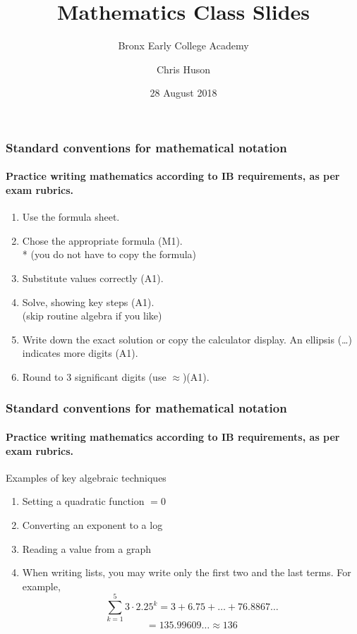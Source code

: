 \documentclass{beamer}
\title{Mathematics Class Slides}
\subtitle{Bronx Early College Academy}
\author{Chris Huson}
\date{28 August 2018}
\begin{document}
\frame{\titlepage}


 \frame
 {
   \frametitle{Standard conventions for mathematical notation}
   \framesubtitle{Practice writing mathematics according to IB requirements, as per exam rubrics.}
 \begin{enumerate}
     \item Use the formula sheet.
     \item Chose the appropriate formula (M1).\\*
     (you do not have to copy the formula)
     \item Substitute values correctly (A1).
     \item Solve, showing key steps (A1).\\
     (skip routine algebra if you like)
     \item Write down the exact solution or copy the calculator display. An ellipsis (\ldots) indicates more digits (A1).
     \item Round to 3 significant digits (use $\approx$)(A1).
 \end{enumerate}
 }

 \frame
 {
   \frametitle{Standard conventions for mathematical notation}
   \framesubtitle{Practice writing mathematics according to IB requirements, as per exam rubrics.}
 Examples of key algebraic techniques
 \begin{enumerate}
     \item Setting a quadratic function $=0$
     \item Converting an exponent to a log
     \item Reading a value from a graph
     \item When writing lists, you may write only the first two and the last terms. For example,
 \[\sum_{k=1}^5 3 \cdot 2.25^k =3 + 6.75+\ldots+76.8867\ldots\]
 \[=135.99609\ldots \approx 136\]
 \end{enumerate}
 }
\end{document}
